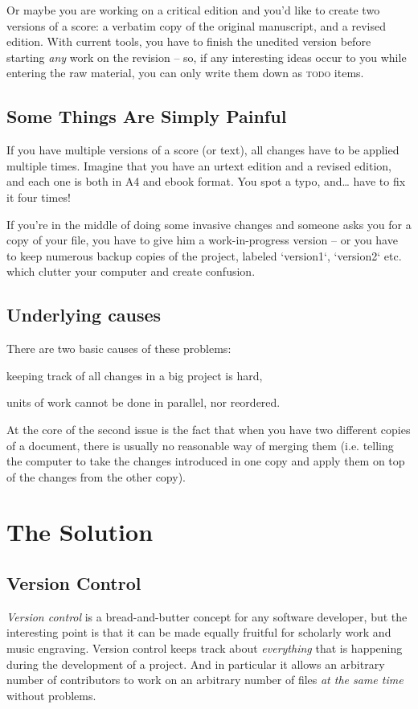 \documentclass[11pt,a4paper]{article}
\begin{document}
Or maybe you are working on a critical edition and you'd like to create two versions
of a score: a verbatim copy of the original manuscript, and a revised edition.
With current tools, you have to finish the unedited version before starting
\emph{any} work on the revision -- so, if any interesting ideas occur to you
while entering the raw material, you can only write them down as \textsc{todo}
items.

\subsection{Some Things Are Simply Painful}
If you have multiple versions of a score (or text), all changes have to be applied
multiple times.  Imagine that you have an urtext edition and a revised edition,
and each one is both in A4 and ebook format.  You spot a typo, and\ldots
have to fix it four times!

If you're in the middle of doing some invasive changes and someone asks you for
a copy of your file, you have to give him a work-in-progress version -- or you
have to keep numerous backup copies of the project, labeled `version1`, `version2`
etc. which clutter your computer and create confusion.

\subsection{Underlying causes}
There are two basic causes of these problems:
\begin{itemize*}
\item keeping track of all changes in a big project is hard,
\item units of work cannot be done in parallel, nor reordered.
\end{itemize*}

At the core of the second issue is the fact that when you have two different
copies of a document, there is usually no reasonable way of merging them
(i.e. telling the computer to take the changes introduced in one copy
and apply them on top of the changes from the other copy).

\section{The Solution}

\subsection{Version Control}
\emph{Version control} is a bread-and-butter concept for any software developer, but the
interesting point is that it can be made equally fruitful for scholarly work and music
engraving. Version control keeps track about \emph{everything} that is happening during
the development of a project. And in particular it allows an arbitrary number of contributors
to work on an arbitrary number of files \emph{at the same time} without problems.
\end{document}
